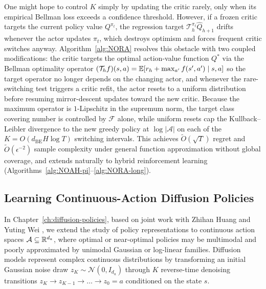\begin{aigenblock}
One might hope to control $K$ simply by updating the critic rarely, only when its empirical Bellman loss exceeds a confidence threshold. However, if a frozen critic targets the current policy value $Q^{\pi_t}$, the regression target $\mathcal{T}_h^{\pi_t} \widehat{Q}_{h+1}$ drifts whenever the actor updates $\pi_t$, which destroys optimism and forces frequent critic switches anyway. Algorithm~\ref{alg:NORA} resolves this obstacle with two coupled modifications: the critic targets the optimal action-value function $Q^*$ via the Bellman optimality operator $(\mathcal{T}_h f)(s,a) = \mathbb{E}[r_h + \max_{a'} f(s',a') \mid s,a]$ so the target operator no longer depends on the changing actor, and whenever the rare-switching test triggers a critic refit, the actor resets to a uniform distribution before resuming mirror-descent updates toward the new critic. Because the maximum operator is $1$-Lipschitz in the supremum norm, the target class covering number is controlled by $\mathcal{F}$ alone, while uniform resets cap the Kullback--Leibler divergence to the new greedy policy at $\log|\mathcal{A}|$ on each of the $K = O(d_{\mathrm{BE}} H \log T)$ switching intervals. This achieves $\widetilde{O}(\sqrt{T})$ regret and $\widetilde{O}(\epsilon^{-2})$ sample complexity under general function approximation without global coverage, and extends naturally to hybrid reinforcement learning (Algorithms~\ref{alg:NOAH-pi}--\ref{alg:NORA-long}).

\subsection{Learning Continuous-Action Diffusion Policies}

In Chapter~\ref{ch:diffusion-policies}, based on joint work with Zhihan Huang and Yuting Wei \citep{tan2026learning}, we extend the study of policy representations to continuous action spaces $\mathcal{A} \subseteq {\mathbb{R}}^{d_a}$, where optimal or near-optimal policies may be multimodal and poorly approximated by unimodal Gaussian or log-linear families. Diffusion models represent complex continuous distributions by transforming an initial Gaussian noise draw $z_K \sim \mathcal{N}(0, I_{d_a})$ through $K$ reverse-time denoising transitions $z_K \to z_{K-1} \to \dots \to z_0 = a$ conditioned on the state $s$.


\end{aigenblock}
